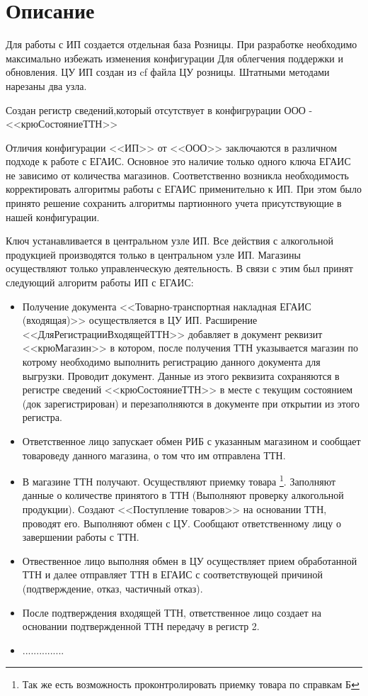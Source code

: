 \section{Описание}

Для работы с ИП создается отдельная база Розницы. При разработке необходимо максимально избежать изменения конфигурации Для облегчения поддержки и обновления. ЦУ ИП создан из cf файла ЦУ розницы. Штатными методами нарезаны два узла.

Создан регистр сведений,который отсутствует в конфигрурации ООО - <<крюСостояниеТТН>> \par

Отличия конфигурации <<ИП>> от <<ООО>> заключаются в различном подходе к работе с ЕГАИС.
 \framebox[0.65\textwidth][c]{\textcolor{blue}{И мы до сих пор не знаем есть ли отличия в торговле табаком!}} Основное это наличие только одного ключа ЕГАИС не зависимо от количества магазинов. Соответственно возникла необходимость корректировать алгоритмы работы с ЕГАИС применительно к ИП. При этом было принято решение сохранить алгоритмы партионного учета присутствующие в нашей конфигурации.\par
 Ключ устанавливается в центральном узле ИП. Все действия с алкогольной продукцией производятся только в центральном узле ИП. Магазины осуществляют только управленческую деятельность. В связи с этим  был принят следующий алгоритм работы ИП с ЕГАИС:
 \begin{itemize}
     \item Получение документа <<Товарно-транспортная накладная ЕГАИС (входящая)>> осуществляется в ЦУ ИП.
     Расширение <<ДляРегистрацииВходящейТТН>> добавляет в документ реквизит <<крюМагазин>> в котором, после получения ТТН указывается магазин по котрому необходимо выполнить регистрацию данного документа для выгрузки. Проводит документ. Данные из этого реквизита сохраняются в регистре сведений <<крюСостояниеТТН>> в месте с текущим состоянием (док зарегистрирован) и перезаполняются в документе при открытии из этого регистра.
     \item  Ответственное лицо запускает обмен РИБ с указанным магазином и сообщает товароведу данного магазина, о том что им отправлена ТТН.
     \item В магазине ТТН получают. Осуществляют приемку товара \footnote{Так же есть возможность проконтролировать приемку товара по справкам Б}. Заполняют данные о количестве принятого в ТТН (Выполняют проверку алкогольной продукции). Создают <<Поступление товаров>> на основании ТТН, проводят его. Выполняют обмен с ЦУ. Сообщают ответственному лицу о завершении работы с ТТН.
     \item Отвественное лицо выполняя обмен в ЦУ осуществляет прием обработанной ТТН и далее отправляет ТТН в ЕГАИС с соответствующей причиной (подтверждение, отказ, частичный отказ).
     \item После подтверждения входящей ТТН, ответственное лицо создает на основании подтвержденной ТТН передачу в регистр 2.
     \item ...............
 \end{itemize}
